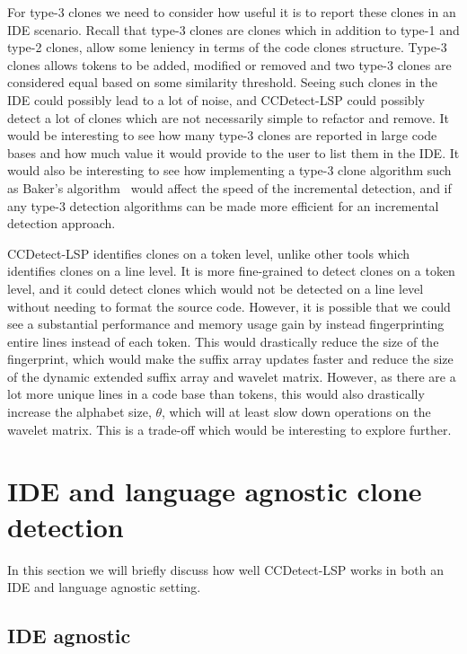 For type-3 clones we need to consider how useful it is to report these clones in an IDE
scenario. Recall that type-3 clones are clones which in addition to type-1 and type-2
clones, allow some leniency in terms of the code clones structure. Type-3 clones allows
tokens to be added, modified or removed and two type-3 clones are considered equal based
on some similarity threshold. Seeing such clones in the IDE could possibly lead to a lot
of noise, and CCDetect-LSP could possibly detect a lot of clones which are not necessarily
simple to refactor and remove. It would be interesting to see how many type-3 clones are
reported in large code bases and how much value it would provide to the user to list them
in the IDE. It would also be interesting to see how implementing a type-3 clone algorithm
such as Baker's algorithm~\cite{BakerSparseDynamicProgramming} would affect the speed of
the incremental detection, and if any type-3 detection algorithms can be made more
efficient for an incremental detection approach.

CCDetect-LSP identifies clones on a token level, unlike other tools which identifies
clones on a line level\cite{Zibran_real_time_search}. It is more fine-grained to detect
clones on a token level, and it could detect clones which would not be detected on a line
level without needing to format the source code. However, it is possible that we could see
a substantial performance and memory usage gain by instead fingerprinting entire lines
instead of each token. This would drastically reduce the size of the fingerprint, which
would make the suffix array updates faster and reduce the size of the dynamic extended
suffix array and wavelet matrix. However, as there are a lot more unique lines in a code
base than tokens, this would also drastically increase the alphabet size, $\theta$, which
will at least slow down operations on the wavelet matrix. This is a trade-off which would
be interesting to explore further.

\section{IDE and language agnostic clone detection}

In this section we will briefly discuss how well CCDetect-LSP works in both an IDE and
language agnostic setting.

\subsection*{IDE agnostic}

